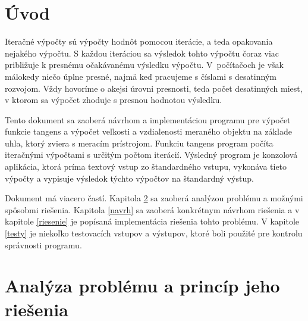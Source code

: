 \documentclass[12pt,a4paper,titlepage,final]{article}
\begin{document}

\def\author{Viktor Jančík}
\def\email{xjanci09@stud.fit.vutbr.cz}
\def\projname{Iteračné výpočty}



\pagestyle{plain}
\setcounter{page}{1}
\tableofcontents

\newpage
\pagestyle{plain}
\setcounter{page}{1}

\section{Úvod} \label{uvod}
Iteračné výpočty sú výpočty hodnôt pomocou iterácie, a teda opakovania nejakého výpočtu. S každou iteráciou sa výsledok tohto výpočtu čoraz viac približuje k presnému očakávanému výsledku výpočtu. V~počítačoch je však málokedy niečo úplne presné, najmä keď pracujeme s číslami s desatinným rozvojom. Vždy hovoríme o akejsi úrovni presnosti, teda počet desatinných miest, v ktorom sa výpočet zhoduje s presnou hodnotou výsledku.

Tento dokument sa zaoberá návrhom a implementáciou programu pre výpočet funkcie tangens a výpočet veľkosti a vzdialenosti meraného objektu na základe uhla, ktorý zviera s meracím prístrojom. Funkciu tangens program počíta iteračnými výpočtami s určitým počtom iterácií. Výsledný program je konzolová aplikácia, ktorá príma textový vstup zo štandardného vstupu, vykonáva tieto výpočty a vypisuje výsledok týchto výpočtov na štandardný výstup.

Dokument má viacero častí. Kapitola \ref{analyza} sa zaoberá analýzou problému a možnými spôsobmi riešenia. Kapitola \ref{navrh} sa zaoberá konkrétnym návrhom riešenia a v kapitole \ref{riesenie} je popísaná implementácia riešenia tohto problému. V kapitole  \ref{testy} je niekoľko testovacích vstupov a výstupov, ktoré boli použité pre kontrolu správnosti programu.

\section{Analýza problému a princíp jeho riešenia} \label{analyza}
\end{document}
